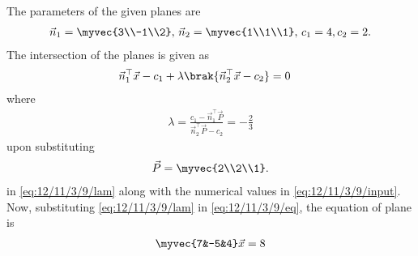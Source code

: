 The parameters of the given planes are
\begin{align}
	\label{eq:12/11/3/9/input}
 \vec{n}_1 = \myvec{3\\-1\\2},\,
 \vec{n}_2 = \myvec{1\\1\\1},\,
	c_1 = 4, c_2 = 2.
\end{align}
The intersection of the planes is given as
\begin{align}
	\label{eq:12/11/3/9/eq}
\vec{n}_1^{\top}{\vec{x}} - {c}_1 + \lambda\brak{\vec{n}_2^{\top}{\vec{x}} - {c}_2} &= 0
\end{align}
where 
\begin{align}
	\label{eq:12/11/3/9/lam}
	\lambda = \frac{{c}_1 - \vec{n}_1^{\top}\vec{P}}{\vec{n}_2^{\top}\vec{P} - {c}_2} 
= -\frac{2}{3}  
\end{align}
upon substituting 
\begin{align}
\vec{P} = \myvec{2\\2\\1}.
\end{align}
	in \eqref{eq:12/11/3/9/lam} along with 
the numerical values in 
	\eqref{eq:12/11/3/9/input}.
	Now, substituting
	\eqref{eq:12/11/3/9/lam}
	in \eqref{eq:12/11/3/9/eq},
the equation of plane is 
\begin{align}
 \myvec{7&-5&4}\vec{x} = 8
\end{align}

